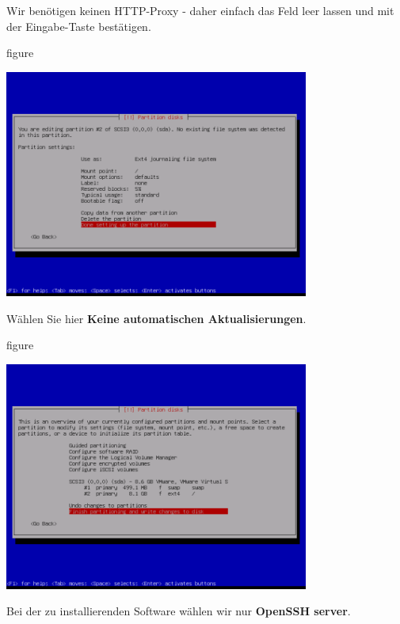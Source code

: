 \pagebreak
Wir benötigen keinen HTTP-Proxy - daher einfach das Feld leer lassen
und mit der Eingabe-Taste bestätigen.

\begin{nofloat}{figure}
\begin{center}
\includegraphics[width=0.75\textwidth]{screenshots/25_ubuntu_install.png}
\end{center}
\end{nofloat}

Wählen Sie hier \textbf{Keine automatischen Aktualisierungen}.

\begin{nofloat}{figure}
\begin{center}
\includegraphics[width=0.75\textwidth]{screenshots/26_ubuntu_install.png}
\end{center}
\end{nofloat}

\pagebreak
Bei der zu installierenden Software wählen wir nur \textbf{OpenSSH server}.

